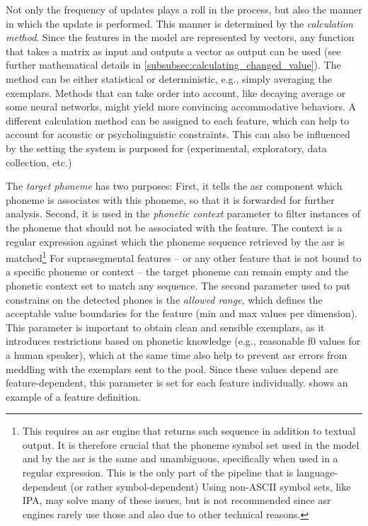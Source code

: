 Not only the frequency of updates plays a roll in the process, but also the manner in which the update is performed.
This manner is determined by the \textit{calculation method}.
Since the features in the model are represented by vectors, any function that takes a matrix as input and outputs a vector as output can be used (see further mathematical details in \cref{subsubsec:calculating_changed_value}).
The method can be either statistical or deterministic, e.g., simply averaging the exemplars.
Methods that can take order into account, like decaying average or some neural networks, might yield more convincing accommodative behaviors.
A different calculation method can be assigned to each feature, which can help to account for acoustic or psycholinguistic constraints.
This can also be influenced by the setting the system is purposed for (experimental, exploratory, data collection, etc.)

The \emph{target phoneme} has two purposes:
First, it tells the \ac{asr} component which phoneme is associates with this phoneme, so that it is forwarded for further analysis.
Second, it is used in the \emph{phonetic context} parameter to filter instances of the phoneme that should not be associated with the feature.
The context is a regular expression against which the phoneme sequence retrieved by the \ac{asr} is matched\footnote{This requires an \ac{asr} engine that returns such sequence in addition to textual output.
It is therefore crucial that the phoneme symbol set used in the model and by the \ac{asr} is the same and unambiguous, specifically when used in a regular expression.
This is the only part of the pipeline that is language-dependent (or rather symbol-dependent)
Using non-ASCII symbol sets, like IPA, may solve many of these issues, but is not recommended since \ac{asr} engines rarely use those and also due to other technical reasons.}
For suprasegmental features -- or any other feature that is not bound to a specific phoneme or context -- the target phoneme can remain empty and the phonetic context set to match any sequence.
The second parameter used to put constrains on the detected phones is the \emph{allowed range}, which defines the acceptable value boundaries for the feature (min and max values per dimension).
This parameter is important to obtain clean and sensible exemplars, as it introduces restrictions based on phonetic knowledge (e.g., reasonable \ac{f0} values for a human speaker), which at the same time also help to prevent \ac{asr} errors from meddling with the exemplars sent to the pool.
Since these values depend are feature-dependent, this parameter is set for each feature individually.
 shows an example of a feature definition.

